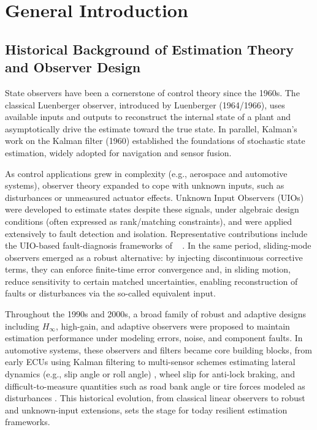 \chapter{General Introduction}\label{chp1_intro}


\section{Historical Background of Estimation Theory and Observer Design}
State observers have been a cornerstone of control theory since the 1960s. The classical Luenberger observer, introduced by Luenberger (1964/1966), uses available inputs and outputs to reconstruct the internal state of a plant and asymptotically drive the estimate toward the true state. In parallel, Kalman's work on the Kalman filter (1960) established the foundations of stochastic state estimation, widely adopted for navigation and sensor fusion.

As control applications grew in complexity (e.g., aerospace and automotive systems), observer theory expanded to cope with unknown inputs, such as disturbances or unmeasured actuator effects. Unknown Input Observers (UIOs) were developed to estimate states despite these signals, under algebraic design conditions (often expressed as rank/matching constraints), and were applied extensively to fault detection and isolation. Representative contributions include the UIO-based fault-diagnosis frameworks of ~\cite{CORLESS1998757} . In the same period, sliding-mode observers emerged as a robust alternative: by injecting discontinuous corrective terms, they can enforce finite-time error convergence and, in sliding motion, reduce sensitivity to certain matched uncertainties, enabling reconstruction of faults or disturbances via the so-called equivalent input.

Throughout the 1990s and 2000s, a broad family of robust and adaptive designs including $H_\infty$, high-gain, and adaptive observers were proposed to maintain estimation performance under modeling errors, noise, and component faults. In automotive systems, these observers and filters became core building blocks, from early ECUs using Kalman filtering to multi-sensor schemes estimating lateral dynamics (e.g., slip angle or roll angle) \cite{VehicleDynamoicEstiamtion}, wheel slip for anti-lock braking, and difficult-to-measure quantities such as road bank angle or tire forces modeled as disturbances \cite{Hashemi04052017}. This historical evolution, from classical linear observers to robust and unknown-input extensions, sets the stage for today resilient estimation frameworks.
